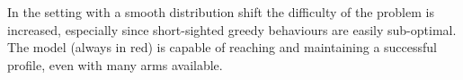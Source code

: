\noindent In the setting with a smooth distribution shift the difficulty of the problem is increased, especially since short-sighted greedy behaviours are easily sub-optimal. The model (always in red) is capable of reaching and maintaining a successful profile, even with many arms available.




\newpage
